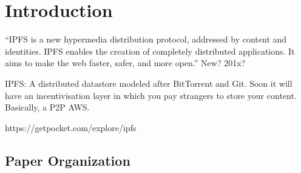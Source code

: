 
\section{Introduction}

``IPFS is a new hypermedia distribution protocol, addressed by content
and identities. IPFS enables the creation of completely distributed
applications. It aims to make the web faster, safer, and more open.''
New? 201x?

{IPFS: A distributed datastore modeled after BitTorrent and Git. Soon
  it will have an incentivisation layer in which you pay strangers to
  store your content. Basically, a P2P AWS.}





https://getpocket.com/explore/ipfs

\subsection{Paper Organization}


